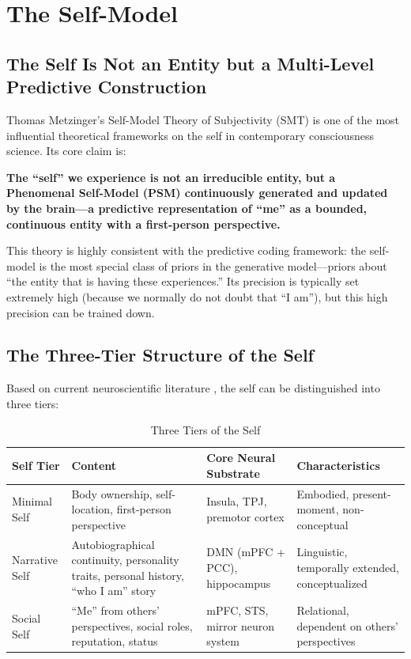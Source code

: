 \documentclass[11pt,a4paper]{article}
\begin{document}
\section{The Self-Model}

\subsection{The Self Is Not an Entity but a Multi-Level Predictive Construction}

Thomas Metzinger's \cite{Metzinger2003} Self-Model Theory of Subjectivity (SMT) is one of the most influential theoretical frameworks on the self in contemporary consciousness science. Its core claim is:

\textbf{The ``self'' we experience is not an irreducible entity, but a Phenomenal Self-Model (PSM) continuously generated and updated by the brain---a predictive representation of ``me'' as a bounded, continuous entity with a first-person perspective.}

This theory is highly consistent with the predictive coding framework: the self-model is the most special class of priors in the generative model---priors about ``the entity that is having these experiences.'' Its precision is typically set extremely high (because we normally do not doubt that ``I am''), but this high precision can be trained down.

\subsection{The Three-Tier Structure of the Self}

Based on current neuroscientific literature \cite{Damasio2010,Gallagher2000,Seth2021}, the self can be distinguished into three tiers:

\begin{table}[htbp]
\centering
\caption{Three Tiers of the Self}
\label{tab:self_tiers}
\begin{tabular}{@{}p{2.5cm}p{4cm}p{4.5cm}p{3cm}@{}}
\toprule
\textbf{Self Tier} & \textbf{Content} & \textbf{Core Neural Substrate} & \textbf{Characteristics} \\
\midrule
Minimal Self & Body ownership, self-location, first-person perspective & Insula, TPJ, premotor cortex & Embodied, present-moment, non-conceptual \\
\addlinespace
Narrative Self & Autobiographical continuity, personality traits, personal history, ``who I am'' story & DMN (mPFC + PCC), hippocampus & Linguistic, temporally extended, conceptualized \\
\addlinespace
Social Self & ``Me'' from others' perspectives, social roles, reputation, status & mPFC, STS, mirror neuron system & Relational, dependent on others' perspectives \\
\bottomrule
\end{tabular}
\end{table}
\end{document}
